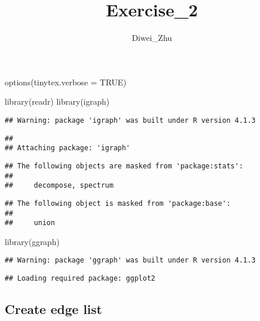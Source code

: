 \documentclass[
]{article}
\title{Exercise\_2}
\author{Diwei\_Zhu}
\date{}
\newenvironment{Shaded}{\begin{snugshade}}{\end{snugshade}}
\newcommand{\AttributeTok}[1]{\textcolor[rgb]{0.77,0.63,0.00}{#1}}
\newcommand{\ConstantTok}[1]{\textcolor[rgb]{0.00,0.00,0.00}{#1}}
\newcommand{\FunctionTok}[1]{\textcolor[rgb]{0.00,0.00,0.00}{#1}}
\newcommand{\NormalTok}[1]{#1}
\begin{document}
\maketitle

\begin{Shaded}
\begin{Highlighting}[]
\FunctionTok{options}\NormalTok{(}\AttributeTok{tinytex.verbose =} \ConstantTok{TRUE}\NormalTok{)}
\end{Highlighting}
\end{Shaded}

\begin{Shaded}
\begin{Highlighting}[]
\FunctionTok{library}\NormalTok{(readr)}
\FunctionTok{library}\NormalTok{(igraph)}
\end{Highlighting}
\end{Shaded}

\begin{verbatim}
## Warning: package 'igraph' was built under R version 4.1.3
\end{verbatim}

\begin{verbatim}
## 
## Attaching package: 'igraph'
\end{verbatim}

\begin{verbatim}
## The following objects are masked from 'package:stats':
## 
##     decompose, spectrum
\end{verbatim}

\begin{verbatim}
## The following object is masked from 'package:base':
## 
##     union
\end{verbatim}

\begin{Shaded}
\begin{Highlighting}[]
\FunctionTok{library}\NormalTok{(ggraph)}
\end{Highlighting}
\end{Shaded}

\begin{verbatim}
## Warning: package 'ggraph' was built under R version 4.1.3
\end{verbatim}

\begin{verbatim}
## Loading required package: ggplot2
\end{verbatim}

\hypertarget{create-edge-list}{%
\subsection{Create edge list}\label{create-edge-list}}
\end{document}
